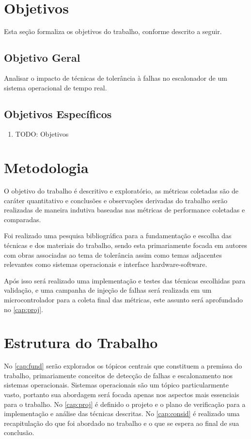 \section{Objetivos}

Esta seção formaliza os objetivos do trabalho, conforme descrito a seguir.

\bigskip
\subsection{Objetivo Geral}

Analisar o impacto de técnicas de tolerância à falhas no escalonador de um sistema operacional de tempo real.

\bigskip
\subsection{Objetivos Específicos}

\begin{enumerate}
    \item TODO: Objetivos
\end{enumerate}

\section{Metodologia}

O objetivo do trabalho é descritivo e exploratório, as métricas coletadas são de caráter quantitativo e conclusões e observações derivadas do trabalho serão realizadas de maneira indutiva baseadas nas métricas de performance coletadas e comparadas.

Foi realizado uma pesquisa bibliográfica para a fundamentação e escolha das técnicas e dos materiais do trabalho, sendo esta primariamente focada em autores com obras associadas ao tema de tolerância assim como temas adjacentes relevantes como sistemas operacionais e interface hardware-software.

Após isso será realizado uma implementação e testes das técnicas escolhidas para validação, e uma campanha de injeção de falhas será realizada em um microcontrolador para a coleta final das métricas, este assunto será aprofundado no \autoref{cap:proj}.

\section{Estrutura do Trabalho}

No \autoref{cap:fund} serão explorados os tópicos centrais que constituem a premissa do trabalho, primariamente conceitos de detecção de falhas e escalonamento nos sistemas operacionais. Sistemas operacionais são um tópico particularmente vasto, portanto sua abordagem será focada apenas nos aspectos mais essenciais para o trabalho. No \autoref{cap:proj} é definido o projeto e o plano de verificação para a implementação e análise das técnicas descritas. No \autoref{cap:consid} é realizado uma recapitulação do que foi abordado no trabalho e o que se espera ao final de sua conclusão.


